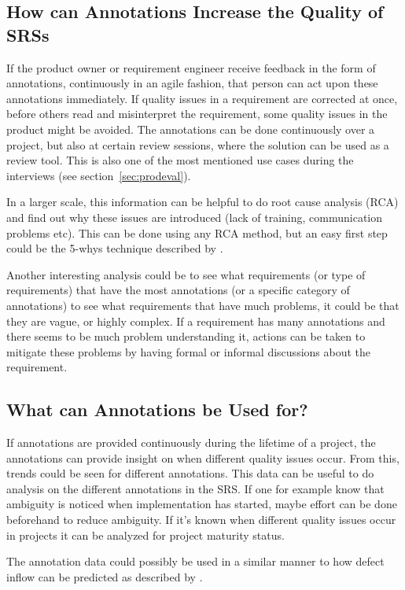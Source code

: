 \subsection{How can Annotations Increase the Quality of SRSs}
If the product owner or requirement engineer receive feedback in the form of annotations, continuously in an agile fashion, that person can act upon these annotations immediately. If quality issues in a requirement are corrected at once, before others read and misinterpret the requirement, some quality issues in the product might be avoided. The annotations can be done continuously over a project, but also at certain review sessions, where the solution can be used as a review tool. This is also one of the most mentioned use cases during the interviews (see section~\ref{sec:prodeval}).

In a larger scale, this information can be helpful to do root cause analysis (RCA) and find out why these issues are introduced (lack of training, communication problems etc). This can be done using any RCA method, but an easy first step could be the 5-whys technique described by \citet{5whys}.

Another interesting analysis could be to see what requirements (or type of requirements) that have the most annotations (or a specific category of annotations) to see what requirements that have much problems, it could be that they are vague, or highly complex. If a requirement has many annotations and there seems to be much problem understanding it, actions can be taken to mitigate these problems by having formal or informal discussions about the requirement. 

\subsection{What can Annotations be Used for?}
\label{whatcanbeused}
If annotations are provided continuously during the lifetime of a project, the annotations can provide insight on when different quality issues occur. From this, trends could be seen for different annotations. This data can be useful to do analysis on the different annotations in the SRS. If one for example know that ambiguity is noticed when implementation has started, maybe effort can be done beforehand to reduce ambiguity. If it's known when different quality issues occur in projects it can be analyzed for project maturity status. 

The annotation data could possibly be used in a similar manner to how defect inflow can be predicted as described by \citet{mstaronmetrics}.

